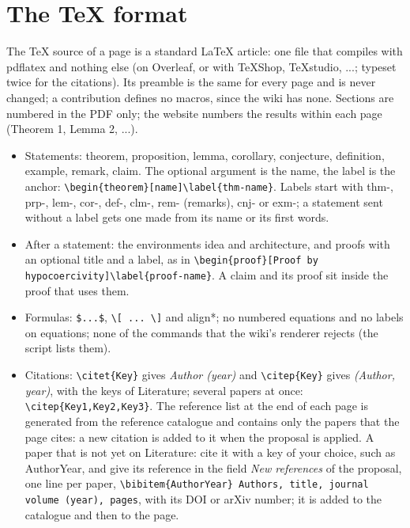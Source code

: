 \documentclass[11pt]{article}
\theoremstyle{definition}
\theoremstyle{remark}
\newcommand{\wikilink}[2]{\ifx\relax#2\relax#1\else#2\fi}
\newcommand{\nowikicode}[1]{\texttt{\frenchspacing#1}}
\begin{document}
\section{The TeX format}
The TeX source of a page is a standard LaTeX article: one file that compiles with pdflatex and nothing else (on Overleaf, or with TeXShop, TeXstudio, ...; typeset twice for the citations). Its preamble is the same for every page and is never changed; a contribution defines no macros, since the wiki has none. Sections are numbered in the PDF only; the website numbers the results within each page (Theorem 1, Lemma 2, ...).
\begin{itemize}
  \item Statements: theorem, proposition, lemma, corollary, conjecture, definition, example, remark, claim. The optional argument is the name, the label is the anchor: \nowikicode{\textbackslash{}begin\{theorem\}\allowbreak{}[name]\textbackslash{}label\{thm-name\}}. Labels start with thm-, prp-, lem-, cor-, def-, clm-, rem- (remarks), cnj- or exm-; a statement sent without a label gets one made from its name or its first words.
  \item After a statement: the environments idea and architecture, and proofs with an optional title and a label, as in \nowikicode{\textbackslash{}begin\{proof\}\allowbreak{}[Proof by hypocoercivity]\textbackslash{}label\{proof-name\}}. A claim and its proof sit inside the proof that uses them.
  \item Formulas: \nowikicode{\$...\$}, \nowikicode{\textbackslash{}[ ... \textbackslash{}]} and align*; no numbered equations and no labels on equations; none of the commands that the wiki's renderer rejects (the script lists them).
  \item Citations: \nowikicode{\textbackslash{}citet\{Key\}} gives \emph{Author (year)} and \nowikicode{\textbackslash{}citep\{Key\}} gives \emph{(Author, year)}, with the keys of \wikilink{Literature}{}; several papers at once: \nowikicode{\textbackslash{}citep\{Key1,Key2,Key3\}}. The reference list at the end of each page is generated from the reference catalogue and contains only the papers that the page cites: a new citation is added to it when the proposal is applied. A paper that is not yet on \wikilink{Literature}{}: cite it with a key of your choice, such as AuthorYear, and give its reference in the field \emph{New references} of the proposal, one line per paper, \nowikicode{\textbackslash{}bibitem\{AuthorYear\}\allowbreak{} Authors, title, journal volume (year), pages}, with its DOI or arXiv number; it is added to the catalogue and then to the page.

\end{itemize}
\end{document}
